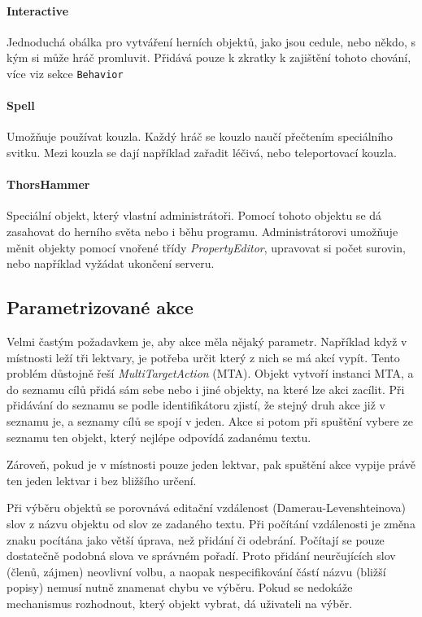\documentclass[11pt, a4paper]{article}
\def\class#1{\emph{#1}}
\begin{document}
\paragraph{Interactive} Jednoduchá obálka pro vytváření herních objektů, jako jsou cedule, nebo někdo, s kým si může hráč promluvit. Přidává pouze k zkratky k zajištění tohoto chování, více viz sekce \texttt{Behavior}

\paragraph{Spell} Umožňuje používat kouzla. Každý hráč se kouzlo naučí přečtením speciálního svitku. Mezi kouzla se dají například zařadit léčivá, nebo teleportovací kouzla.

\paragraph{ThorsHammer} Speciální objekt, který vlastní administrátoři. Pomocí tohoto objektu se dá zasahovat do herního světa nebo i běhu programu. Administrátorovi umožňuje měnit objekty pomocí vnořené třídy \class{PropertyEditor}, upravovat si počet surovin, nebo například vyžádat ukončení serveru.

\subsection{Parametrizované akce}

Velmi častým požadavkem je, aby akce měla nějaký parametr. Například když v místnosti leží tři lektvary, je potřeba určit který z nich se má akcí vypít. Tento problém důstojně řeší \class{MultiTargetAction} (MTA). Objekt vytvoří instanci MTA, a do seznamu cílů přidá sám sebe nebo i jiné objekty, na které lze akci zacílit. Při přidávání do seznamu se podle identifikátoru zjistí, že stejný druh akce již v seznamu je, a seznamy cílů se spojí v jeden. Akce si potom při spuštění vybere ze seznamu ten objekt, který nejlépe odpovídá zadanému textu.

Zároveň, pokud je v místnosti pouze jeden lektvar, pak spuštění akce vypije právě ten jeden lektvar i bez bližšího určení.

Při výběru objektů se porovnává editační vzdálenost (Damerau-Levenshteinova) slov z názvu objektu od slov ze zadaného textu. Při počítání vzdálenosti je změna znaku pocítána jako větší úprava, než přidání či odebrání. Počítají se pouze dostatečně podobná slova ve správném pořadí. Proto přidání neurčujících slov (členů, zájmen) neovlivní volbu, a naopak nespecifikování částí názvu (bližší popisy) nemusí nutně znamenat chybu ve výběru. Pokud se nedokáže mechanismus rozhodnout, který objekt vybrat, dá uživateli na výběr.
\end{document}
